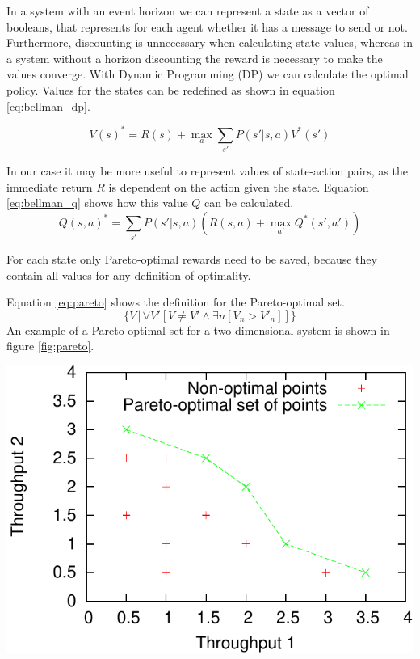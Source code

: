 \documentclass{article}
\makeatletter
\newenvironment{figurehere}
{\def\@captype{figure}}
{}
\makeatother
\begin{document}
\begin{multicols}{2}
		In a system with an event horizon we can represent a state as a vector of
		booleans, that represents for each agent whether it has a message to send
		or not. Furthermore, discounting is unnecessary when calculating state
		values, whereas in a system without a horizon discounting the reward is
		necessary to make the values converge. With Dynamic Programming (DP) we
		can calculate the optimal policy. Values for the states can be redefined
		as shown in equation \ref{eq:bellman_dp}.

		\begin{equation}
		\displaystyle
		V(s)^* = R(s) + \max_a \sum_{s'} P(s'|s, a) V^*(s')
		\label{eq:bellman_dp}
		\end{equation}

		In our case it may be more useful to represent values of state-action
		pairs, as the immediate return $R$ is dependent on the action given the
		state. Equation \ref{eq:bellman_q} shows how this value $Q$ can be
		calculated.
		\begin{equation}
		\displaystyle
		Q(s, a)^* = \sum_{s'} P(s'|s, a) \left(R(s, a) + \max_{a'} Q^*(s', a')\right)
		\label{eq:bellman_q}
		\end{equation}

		For each state only Pareto-optimal rewards need to be saved, because they
		contain all values for any definition of optimality.

		Equation \ref{eq:pareto} shows the definition for the Pareto-optimal set.
		\begin{equation}
			\label{eq:pareto}
			\Big\{ V\, \Big| \, \forall V'[ V \neq V' \land \exists n [V_n > V'_n]] \Big\}
		\end{equation}
		An example of a Pareto-optimal set for a two-dimensional system is shown in
		figure \ref{fig:pareto}.

	\begin{figurehere}
		\centering
		\includegraphics[scale=0.68]{images/pareto}
	   \label{fig:pareto}
	\end{figurehere}


\end{multicols}
\end{document}
